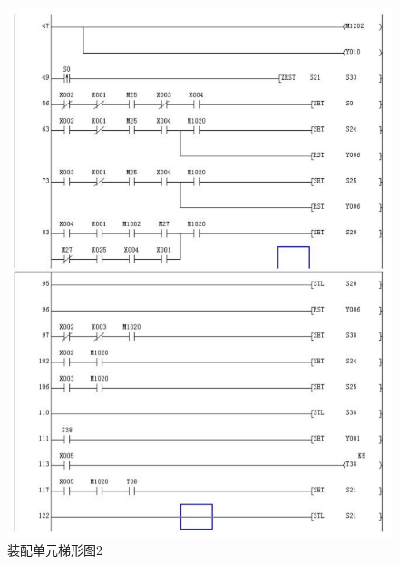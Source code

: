\documentclass[12pt]{article}
\begin{document}
\begin{figure}[htbp]
    \centering
    \includegraphics[scale=0.9]{fig/PLC2.png}
    \caption{装配单元梯形图2}
\end{figure} 
\end{document}
